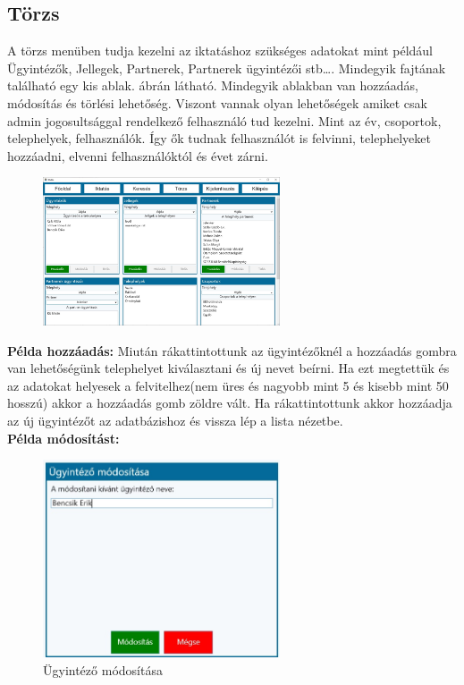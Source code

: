 \documentclass[
]{thesis-ekf}
\theoremstyle{definition}
\theoremstyle{remark}
\begin{document}
\subsection{Törzs}
A törzs menüben tudja kezelni az iktatáshoz szükséges adatokat mint például Ügyintézők, Jellegek, Partnerek, Partnerek ügyintézői stb\dots. Mindegyik fajtának található egy kis ablak. \Az{\ref{fig:ctorzs}} ábrán látható. Mindegyik ablakban van hozzáadás, módosítás és törlési lehetőség. Viszont vannak olyan lehetőségek amiket csak admin jogosultsággal rendelkező felhasználó tud kezelni. Mint az év, csoportok, telephelyek, felhasználók. Így ők tudnak felhasználót is felvinni, telephelyeket hozzáadni, elvenni felhasználóktól és évet zárni. 
\begin{figure}[h!]
	\centering
	\includegraphics[width=7cm]{dokukepek/ctorzs}
	\caption{}
	\label{fig:ctorzs}
\end{figure}
\textbf{Példa hozzáadás:}
Miután rákattintottunk az ügyintézőknél a hozzáadás gombra van lehetőségünk telephelyet kiválasztani és új nevet beírni. Ha ezt megtettük és az adatokat helyesek a felvitelhez(nem üres és nagyobb mint 5 és kisebb mint 50 hosszú) akkor a hozzáadás gomb zöldre vált. Ha rákattintottunk akkor hozzáadja az új ügyintézőt az adatbázishoz és vissza lép a lista nézetbe. \\
\textbf{Példa módosítást:}
\begin{figure}[h!]
	\centering
	\includegraphics[width=7cm]{dokukepek/ctorzsmod}
	\caption{Ügyintéző módosítása}
	\label{fig:ctorzsmod}
\end{figure}
\end{document}
